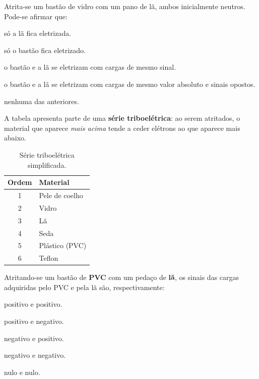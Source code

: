 \begin{questao}[1]{}

Atrita-se um bastão de vidro com um pano de lã, ambos inicialmente neutros.
Pode-se afirmar que:
\begin{alternativas}
\item só a lã fica eletrizada.
\item só o bastão fica eletrizado.
\item o bastão e a lã se eletrizam com cargas de mesmo sinal.
\item o bastão e a lã se eletrizam com cargas de mesmo valor absoluto e sinais opostos.
\item nenhuma das anteriores.
\end{alternativas}


\end{questao}
\begin{questao}[1]{}

A tabela apresenta parte de uma \textbf{série triboelétrica}: ao serem atritados,
o material que aparece \emph{mais acima} tende a ceder elétrons ao que aparece
mais abaixo.
\begin{table}[H]
\centering
\small\sffamily
\setlength{\arrayrulewidth}{0.5pt}
\begin{tabular}{@{}c l@{}}
\toprule
\textbf{Ordem} & \textbf{Material}\\
\midrule
1 & Pele de coelho\\
2 & Vidro\\
3 & Lã\\
4 & Seda\\
5 & Plástico (PVC)\\
6 & Teflon\\
\bottomrule
\end{tabular}
\caption{Série triboelétrica simplificada.}
\end{table}
Atritando-se um bastão de \textbf{PVC} com um pedaço de \textbf{lã}, os sinais das
cargas adquiridas pelo PVC e pela lã são, respectivamente:
\begin{alternativas}[2]
\item positivo e positivo.
\item positivo e negativo.
\item negativo e positivo.
\item negativo e negativo.
\item nulo e nulo.
\end{alternativas}


\end{questao}
